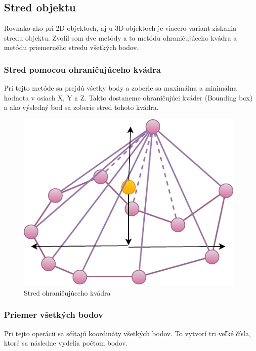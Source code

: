 \subsection*{Stred objektu}

Rovnako ako pri 2D objektoch, aj u 3D objektoch je viacero variant získania stredu objektu. Zvolil som dve metódy a to metódu ohraničujúceho kvádra a metódu priemerného stredu všetkých bodov.


\subsubsection{Stred pomocou ohraničujúceho kvádra}
Pri tejto metóde sa prejdú všetky body a zoberie sa maximálna a minimálna hodnota v osiach X, Y a Z. Takto dostaneme ohraničujúci kváder (Bounding box) a ako výsledný bod sa zoberie stred tohoto kvádra.
		
\begin{figure}[H]
	\centering
	\includegraphics[height=0.3\textwidth]{obrazky-figures/Diagram/Draw/1Points/DP Navrh operacii-0D - PointMiddle of 3D object.pdf}
	\caption{Stred ohraničujúceho kvádra}
	\label{fig:PointMiddle of 3D object}
\end{figure}

\subsubsection{Priemer všetkých bodov} 
Pri tejto operácii sa sčítajú koordináty všetkých bodov. To vytvorí tri veľké čísla, ktoré sa následne vydelia počtom bodov.










